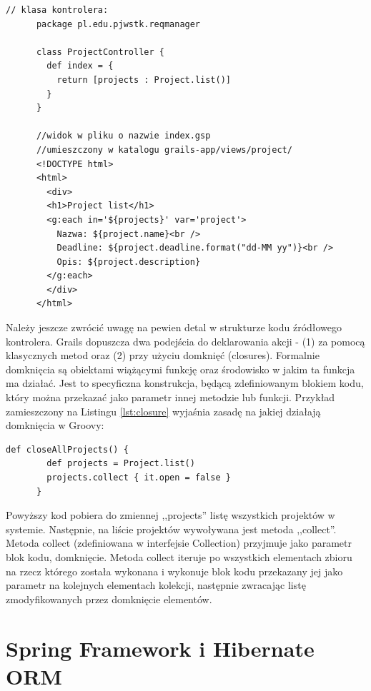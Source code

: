     \begin{lstlisting}[caption={Widok i kontroler}, label={lst:contView}]
      // klasa kontrolera:
      package pl.edu.pjwstk.reqmanager

      class ProjectController {
        def index = { 
          return [projects : Project.list()]
        }   
      }

      //widok w pliku o nazwie index.gsp 
      //umieszczony w katalogu grails-app/views/project/
      <!DOCTYPE html>
      <html>
        <div>
        <h1>Project list</h1>
        <g:each in='${projects}' var='project'>
          Nazwa: ${project.name}<br />
          Deadline: ${project.deadline.format("dd-MM yy")}<br />
          Opis: ${project.description} 
        </g:each>
        </div>
      </html>

    \end{lstlisting}

    Należy jeszcze zwrócić uwagę na pewien detal w strukturze kodu źródłowego kontrolera. Grails dopuszcza dwa podejścia do deklarowania akcji - (1) za pomocą klasycznych metod oraz (2) przy użyciu domknięć (closures). Formalnie domknięcia są obiektami wiążącymi funkcję oraz środowisko w jakim ta funkcja ma działać. Jest to specyficzna konstrukcja, będącą zdefiniowanym blokiem kodu, który można przekazać jako parametr innej metodzie lub funkcji. Przykład zamieszczony na Listingu \ref{lst:closure} wyjaśnia zasadę na jakiej działają domknięcia w Groovy: 

    \begin{lstlisting}[caption={Domknięcie w Groovy}, label={lst:closure}]
      def closeAllProjects() {
        def projects = Project.list()
        projects.collect { it.open = false }
      }
    \end{lstlisting} 
    
    Powyższy kod pobiera do zmiennej ,,projects'' listę wszystkich projektów w systemie. Następnie, na liście projektów wywoływana jest metoda ,,collect''. Metoda collect (zdefiniowana w interfejsie Collection) przyjmuje jako parametr blok kodu, domknięcie. Metoda collect iteruje po wszystkich elementach zbioru na rzecz którego została wykonana i wykonuje blok kodu przekazany jej jako parametr na kolejnych elementach kolekcji, następnie zwracając listę zmodyfikowanych przez domknięcie elementów.

    \section{Spring Framework i Hibernate ORM}


